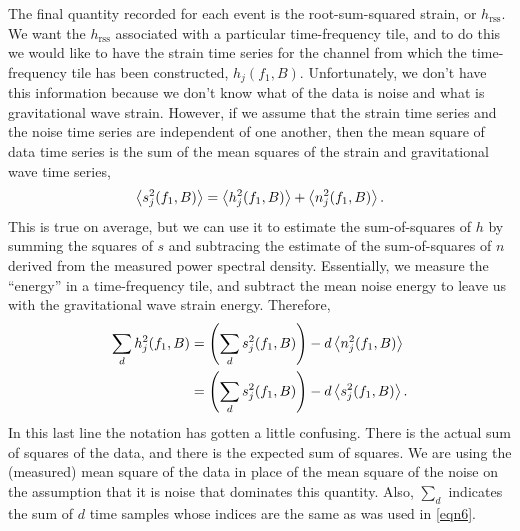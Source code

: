 \documentclass{article}
\begin{document}
The final quantity recorded for each event is the root-sum-squared strain,
or \(h_{\text{rss}}\).  We want the \(h_{\text{rss}}\) associated with a
particular time-frequency tile, and to do this we would like to have the
strain time series for the channel from which the time-frequency tile has
been constructed, \(h_{j}(f_{1}, B)\).  Unfortunately, we don't have this
information because we don't know what of the data is noise and what is
gravitational wave strain.  However, if we assume that the strain time
series and the noise time series are independent of one another, then the
mean square of data time series is the sum of the mean squares of the
strain and gravitational wave time series,
\begin{equation}
\left\langle s_{j}^{2}(f_{1}, B)\right\rangle
   = \left\langle h_{j}^{2}(f_{1}, B)\right\rangle + \left\langle n_{j}^{2}(f_{1}, B)\right\rangle.
\end{equation}
This is true on average, but we can use it to estimate the sum-of-squares
of \(h\) by summing the squares of \(s\) and subtracing the estimate of the
sum-of-squares of \(n\) derived from the measured power spectral density.
Essentially, we measure the ``energy'' in a time-frequency tile, and
subtract the mean noise energy to leave us with the gravitational wave
strain energy.  Therefore,
\begin{align}
\sum_{d} h_{j}^{2}(f_{1}, B)
   & = \left( \sum_{d} s_{j}^{2}(f_{1}, B) \right) - d
   \left\langle n_{j}^{2}(f_{1}, B)\right\rangle
   \\
   & = \left( \sum_{d} s_{j}^{2}(f_{1}, B) \right) - d
   \left\langle s_{j}^{2}(f_{1}, B)\right\rangle.
\end{align}
In this last line the notation has gotten a little confusing.  There is the
actual sum of squares of the data, and there is the expected sum of
squares.  We are using the (measured) mean square of the data in place of
the mean square of the noise on the assumption that it is noise that
dominates this quantity.  Also, \(\sum_{d}\) indicates the sum of \(d\)
time samples whose indices are the same as was used in \eqref{eqn6}.
\end{document}
